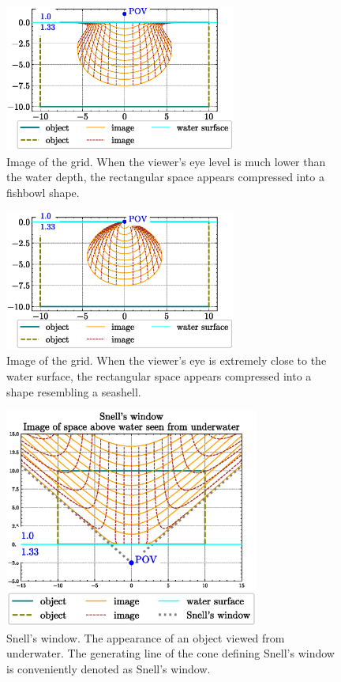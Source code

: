 \documentclass[twocolumn]{article}
\begin{document}
\begin{figure}[!t]
	\centering
	\includegraphics[width=3in]{figs/fishjar.eps}
	\caption{Image of the grid. When the viewer's eye level is much lower than the water depth, the rectangular space appears compressed into a fishbowl shape.}
	\label{fig:fishbowl}
\end{figure}

\begin{figure}[!t]
	\centering
	\includegraphics[width=3in]{figs/seashell_shape.eps}
	\caption{Image of the grid. When the viewer's eye is extremely close to the water surface, the rectangular space appears compressed into a shape resembling a seashell.}
	\label{fig:seashell}
\end{figure}

\begin{figure}[!h]
	\centering
	\includegraphics[width=3.3in]{figs/snell_window.eps}
	\caption{Snell's window. The appearance of an object viewed from underwater. The generating line of the cone defining Snell's window is conveniently denoted as Snell's window.}
	\label{fig:snell_window}
\end{figure}
\end{document}
